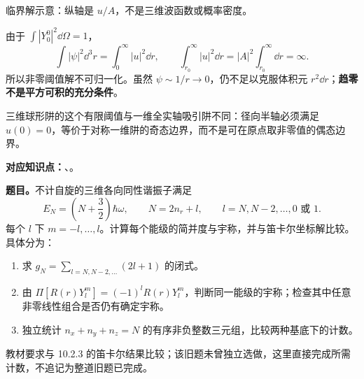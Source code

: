 \begin{checkedsolution}
\begin{center}

\small 临界解示意：纵轴是 $u/A$，不是三维波函数或概率密度。
\end{center}

由于 $\int|Y_0^0|^2\dd\Omega=1$，
\begin{equation}
  \int|\psi|^2\dd^3r=\int_0^\infty|u|^2\dd r,
  \qquad \int_{r_0}^\infty|u|^2\dd r
     =|A|^2\int_{r_0}^\infty\dd r=\infty.
\end{equation}
所以非零阈值解不可归一化。虽然 $\psi\sim1/r\to0$，仍不足以克服体积元 $r^2\dd r$；\textbf{趋零不是平方可积的充分条件}。


三维球形阱的这个有限阈值与一维全实轴吸引阱不同：径向半轴必须满足 $u(0)=0$，等价于对称一维阱的奇态边界，而不是可在原点取非零值的偶态边界。
\end{checkedsolution}

\textbf{对应知识点：}、。

\textbf{题目。}不计自旋的三维各向同性谐振子满足
\begin{equation}
  E_N=\left(N+\frac32\right)\hbar\omega,\qquad
  N=2n_r+l,\qquad l=N,N-2,\ldots,0\text{ 或 }1.
\end{equation}
每个 $l$ 下 $m=-l,\ldots,l$。计算每个能级的简并度与宇称，并与笛卡尔坐标解比较。具体分为：
\begin{enumerate}
  \item 求 $g_N=\sum_{l=N,N-2,\ldots}(2l+1)$ 的闭式。
  \item 由 $\Pi[R(r)Y_l^m]=(-1)^lR(r)Y_l^m$，判断同一能级的宇称；检查其中任意非零线性组合是否仍有确定宇称。
  \item 独立统计 $n_x+n_y+n_z=N$ 的有序非负整数三元组，比较两种基底下的计数。
\end{enumerate}
教材要求与 10.2.3 的笛卡尔结果比较；该旧题未曾独立选做，这里直接完成所需计数，不追记为整道旧题已完成。


